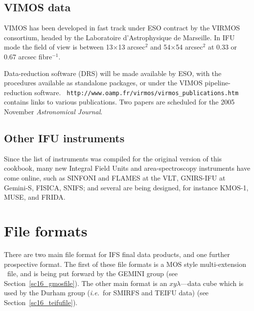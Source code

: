 \documentclass[twoside,11pt]{article}
\newcommand{\htmladdnormallink}[2]{#1}
\newcommand{\htmlref}[2]{#1}
\newcommand{\latex}[1]{#1}
\newcommand{\xlabel}[1]{}
\begin{document}
\subsection{\xlabel{sc16_vimos}VIMOS data\label{sc16_vimos}}

\htmladdnormallink{VIMOS}{http://www.eso.org/instruments/vimos/} has
been developed in fast track under ESO contract by the VIRMOS
consortium, headed by the Laboratoire d'Astrophysique de Marseille. In
IFU mode the field of view is between 13$\times$13 arcsec$^2$ and
54$\times$54 arcsec$^2$ at 0.33 or 0.67 arcsec fibre$^{-1}$.

Data-reduction software (DRS) will be made available by ESO, with the
procedures available as standalone packages, or under the VIMOS
pipeline-reduction software.\goodbreak
\htmladdnormallink{{\tt
http://www.oamp.fr/virmos/virmos\_publications.htm}}{http://www.oamp.fr/virmos/virmos_publications.htm}
contains links to various publications.  Two papers are scheduled for
the 2005 November {\em Astronomical Journal}.

\subsection{\xlabel{sc16_other}Other IFU instruments\label{sc16_other}}

Since the list of instruments was compiled for the original version of
this cookbook, many new Integral Field Units and area-spectroscopy
instruments have come online, such as
\htmladdnormallink{SINFONI}{http://www.eso.org/instruments/sinfoni/}
and \htmladdnormallink{FLAMES}{http://www.eso.org/instruments/flames/}
at the VLT,
\htmladdnormallink{GNIRS-IFU}{http://www.gemini.edu/sciops/instruments/nirs/nirsIndex.html}
at Gemini-S,
\htmladdnormallink{FISICA}{http://www.ctio.noao.edu/diroff/TALKS_PDF/Eikenberry_fisica_ctio05.pdf},
SNIFS; and several are being designed, for instance
\htmladdnormallink{KMOS-1}{http://www.cfai.dur.ac.uk/fix/projects/kmos1/kmos_main.html},
\htmladdnormallink{MUSE}{http://www.cfai.dur.ac.uk/fix/projects/muse/muse.html},
and FRIDA.

\newpage
\section{\xlabel{sc16_fileformat}File formats\label{sc16_fileformat}}

There are two main file format for IFS final data products, and one
further prospective format.  The \htmlref{first}{sc16_gmosfile} of
these file formats is a MOS style multi-extension 
\FITSref\ file, and is
being put forward by the GEMINI group\latex{ (see
Section~\ref{sc16_gmosfile})}.  The other main format is an
$xy\lambda$---\htmlref{data cube}{sc16_teifufile} which is used by the
Durham group (\emph{i.e.}\ for SMIRFS and TEIFU data)\latex{ (see
Section~\ref{sc16_teifufile})}.
\end{document}
